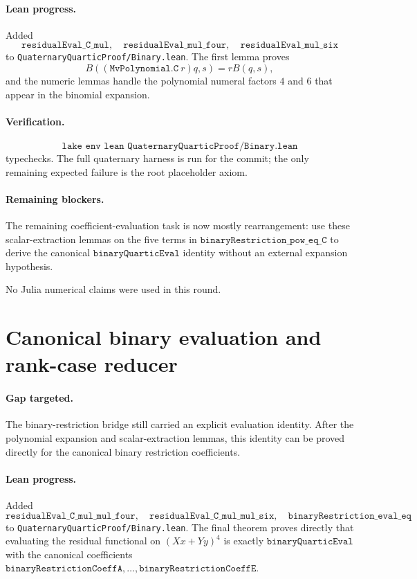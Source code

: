 \documentclass[11pt]{article}
\begin{document}
\paragraph{Lean progress.}
Added
\[
\texttt{residualEval\_C\_mul},\quad
\texttt{residualEval\_mul\_four},\quad
\texttt{residualEval\_mul\_six}
\]
to \texttt{QuaternaryQuarticProof/Binary.lean}.  The first lemma proves
\[
B((\texttt{MvPolynomial.C}\ r)q,s)=rB(q,s),
\]
and the numeric lemmas handle the polynomial numeral factors \(4\) and \(6\)
that appear in the binomial expansion.

\paragraph{Verification.}
\[
\texttt{lake env lean QuaternaryQuarticProof/Binary.lean}
\]
typechecks.  The full quaternary harness is run for the commit; the only
remaining expected failure is the root placeholder axiom.

\paragraph{Remaining blockers.}
The remaining coefficient-evaluation task is now mostly rearrangement: use
these scalar-extraction lemmas on the five terms in
\(\texttt{binaryRestriction\_pow\_eq\_C}\) to derive the canonical
\(\texttt{binaryQuarticEval}\) identity without an external expansion
hypothesis.

No Julia numerical claims were used in this round.

\section*{Canonical binary evaluation and rank-case reducer}

\paragraph{Gap targeted.}
The binary-restriction bridge still carried an explicit evaluation identity.
After the polynomial expansion and scalar-extraction lemmas, this identity can
be proved directly for the canonical binary restriction coefficients.

\paragraph{Lean progress.}
Added
\[
\texttt{residualEval\_C\_mul\_mul\_four},\quad
\texttt{residualEval\_C\_mul\_mul\_six},
\quad
\texttt{binaryRestriction\_eval\_eq}
\]
to \texttt{QuaternaryQuarticProof/Binary.lean}.  The final theorem proves
directly that evaluating the residual functional on \((Xx+Yy)^4\) is exactly
\(\texttt{binaryQuarticEval}\) with the canonical coefficients
\(\texttt{binaryRestrictionCoeffA},\ldots,\texttt{binaryRestrictionCoeffE}\).
\end{document}
